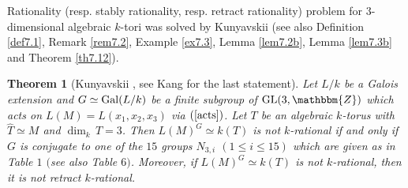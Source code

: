 \documentclass{amsart}
\theoremstyle{plain}
\newtheorem{theorem}{Theorem}[section]
\theoremstyle{definition}
\theoremstyle{remark}
\newcommand{\bZ}{\mathbbm{Z}}\newcommand{\bQ}{\mathbbm{Q}}
\newcommand{\GL}{{\rm GL}}\newcommand{\SL}{{\rm SL}}
\newcounter{sub}\def\tr{\mbox{tr }}
\begin{document}
Rationality (resp. stably rationality, resp. retract rationality) 
problem for $3$-dimensional algebraic 
$k$-tori was solved by Kunyavskii \cite{Kun90} 
(see also Definition \ref{def7.1}, Remark \ref{rem7.2}, Example \ref{ex7.3}, 
Lemma \ref{lem7.2b}, Lemma \ref{lem7.3b} and Theorem \ref{th7.12}). 
%
\begin{theorem}[{Kunyavskii \cite[Theorem 1, Theorem 2]{Kun90}, see Kang \cite[page 25, the fifth paragraph]{Kan12} for the last statement}]\label{thKu}
Let $L/k$ %
be a Galois extension and 
$G\simeq {\rm Gal}(L/k)$ %
be a finite subgroup of $\GL(3,\bZ)$ 
which acts on $L(M)=L(x_1,x_2,x_3)$ 
via $(\ref{acts})$. 
Let $T$ be an algebraic $k$-torus with $\widehat{T}\simeq M$ 
and $\dim_k\, T=3$. 
Then %
$L(M)^G\simeq k(T)$ is not $k$-rational if and only if 
$G$ is conjugate to one of the $15$ groups $N_{3,i}$ $(1\leq i\leq 15)$ 
which are given 
as in {\rm Table} $1$ $($see also {\rm Table} $6$$)$.  
Moreover, if $L(M)^G\simeq k(T)$ is not $k$-rational, 
then it is not retract $k$-rational. %
\end{theorem}
\end{document}

